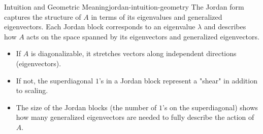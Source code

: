 \begin{remark}{Intuition and Geometric Meaning}{jordan-intuition-geometry}
    The Jordan form captures the structure of \(A\) in terms of its eigenvalues and generalized eigenvectors.
    \medskip
    Each Jordan block corresponds to an eigenvalue \(\lambda\) and describes how \(A\) acts on the space spanned by its eigenvectors and generalized eigenvectors.
    \begin{itemize}[nosep]
        \item If \(A\) is diagonalizable, it stretches vectors along independent directions (eigenvectors).
        \item If not, the superdiagonal \(1\)'s in a Jordan block represent a "shear" in addition to scaling.
        \item The size of the Jordan blocks (the number of \(1\)'s on the superdiagonal) shows how many generalized eigenvectors are needed to fully describe the action of \(A\).
    \end{itemize}
\end{remark}
